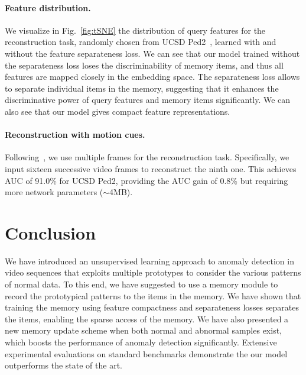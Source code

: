 \documentclass[10pt,twocolumn,letterpaper]{article}
\begin{document}
    		



		
\vspace{-0.5cm}		
		\paragraph{Feature distribution.}
		We visualize in Fig.~\ref{fig:tSNE} the distribution of query features for the reconstruction task, randomly chosen from UCSD Ped2~\cite{li2013anomaly}, learned with and without the feature separateness loss. We can see that our model trained without the separateness loss loses the discriminability of memory items, and thus all features are mapped closely in the embedding space. The separateness loss allows to separate individual items in the memory, suggesting that it enhances the discriminative power of query features and memory items significantly. We can also see that our model gives compact feature representations. 
		
		
\vspace{-0.5cm}
		\paragraph{Reconstruction with motion cues.}
Following~\cite{gong2019memorizing}, we use multiple frames for the reconstruction task. Specifically, we input sixteen successive video frames to reconstruct the ninth one. This achieves AUC of 91.0\% for UCSD Ped2, providing the AUC gain of 0.8\% but requiring more network parameters ($\sim$4MB).		




\vspace{-0.2cm}   
\section{Conclusion}
\vspace{-0.1cm}   
	We have introduced an unsupervised learning approach to anomaly detection in video sequences that exploits multiple prototypes to consider the various patterns of normal data. To this end, we have suggested to use a memory module to record the prototypical patterns to the items in the memory. We have shown that training the memory using feature compactness and separateness losses separates the items, enabling the sparse access of the memory. We have also presented a new memory update scheme when both normal and abnormal samples exist, which boosts the performance of anomaly detection significantly. Extensive experimental evaluations on standard benchmarks demonstrate the our model outperforms the state of the art.
\end{document}
